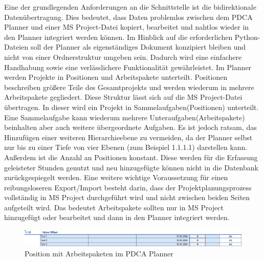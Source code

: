 \documentclass[11pt,a4paper]{report}
\begin{document}
\noindent
Eine der grundlegenden Anforderungen an die Schnittstelle ist die bidirektionale Datenübertragung. Dies bedeutet, dass Daten problemlos zwischen dem PDCA Planner und einer MS Project-Datei kopiert, bearbeitet und nahtlos wieder in den Planner integriert werden können. Im Hinblick auf die erforderlichen Python-Dateien soll der Planner als eigenständiges Dokument konzipiert bleiben und nicht von einer Ordnerstruktur umgeben sein. Dadurch wird eine einfachere Handhabung sowie eine verlässlichere Funktionalität gewährleistet. Im Planner werden Projekte in Positionen und Arbeitspakete unterteilt. Positionen beschreiben größere Teile des Gesamtprojekts und werden wiederum in mehrere Arbeitspakete gegliedert. Diese Struktur lässt sich auf die MS Project-Datei übertragen. In dieser wird ein Projekt in Sammelaufgaben(Positionen) unterteilt. Eine Sammelaufgabe kann wiederum mehrere Unteraufgaben(Arbeitspakete) beinhalten aber auch weitere übergeordnete Aufgaben. Es ist jedoch ratsam, das Hinzufügen einer weiteren Hierarchieebene zu vermeiden, da der Planner selbst nur bis zu einer Tiefe von vier Ebenen (zum Beispiel 1.1.1.1) darstellen kann. Außerdem ist die Anzahl an Positionen konstant. Diese werden für die Erfassung geleisteter Stunden genutzt und neu hinzugefügte können nicht in die Datenbank zurückgespiegelt werden. Eine weitere wichtige Voraussetzung für einen reibungsloseren Export/Import besteht darin, dass der Projektplanungsprozess vollständig in MS Project durchgeführt wird und nicht zwischen beiden Seiten aufgeteilt wird. Das bedeutet Arbeitspakete sollten nur in MS Project hinzugefügt oder bearbeitet und dann in den Planner integriert werden.

\begin{figure}[H]
    \centering
    \includegraphics[width=\linewidth]{images/Excel_Position_Beispiel.png}
    \caption{Position mit Arbeitspaketen im PDCA Planner}
    \label{fig:PDCA_Example}
\end{figure}
\end{document}
